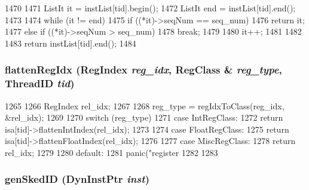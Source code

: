 \begin{DoxyCode}
1470 {
1471     ListIt it = instList[tid].begin();
1472     ListIt end = instList[tid].end();
1473 
1474     while (it != end) {
1475         if ((*it)->seqNum == seq_num)
1476             return it;
1477         else if ((*it)->seqNum > seq_num)
1478             break;
1479 
1480         it++;
1481     }
1482 
1483     return instList[tid].end();
1484 }
\end{DoxyCode}
\hypertarget{classInOrderCPU_a4d739dee63b39a75eca478db2f8091bf}{
\subsubsection[{flattenRegIdx}]{ flattenRegIdx ({\bf RegIndex} {\em reg\_\-idx}, \/  {\bf RegClass} \& {\em reg\_\-type}, \/  {\bf ThreadID} {\em tid})}}
\label{classInOrderCPU_a4d739dee63b39a75eca478db2f8091bf}



\begin{DoxyCode}
1265 {
1266     RegIndex rel_idx;
1267 
1268     reg_type = regIdxToClass(reg_idx, &rel_idx);
1269 
1270     switch (reg_type) {
1271       case IntRegClass:
1272         return isa[tid]->flattenIntIndex(rel_idx);
1273 
1274       case FloatRegClass:
1275         return isa[tid]->flattenFloatIndex(rel_idx);
1276 
1277       case MiscRegClass:
1278         return rel_idx;
1279 
1280       default:
1281         panic("register %
1282     }
1283 }
\end{DoxyCode}
\hypertarget{classInOrderCPU_a1c1ffb2917eb8fd5d147568b3a9ed49d}{
\subsubsection[{genSkedID}]{ genSkedID ({\bf DynInstPtr} {\em inst})}}
\label{classInOrderCPU_a1c1ffb2917eb8fd5d147568b3a9ed49d}



